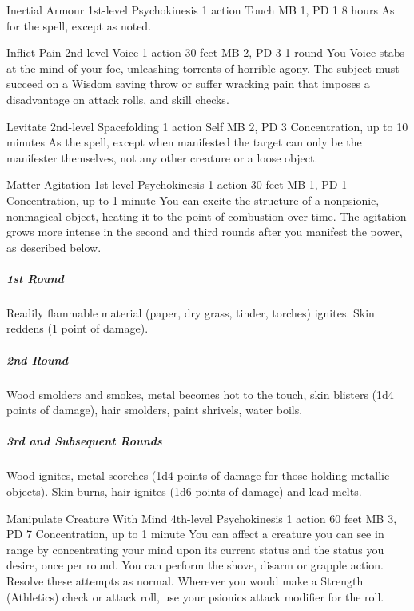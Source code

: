 \DndPowerHeader%
  {Inertial Armour}
  {1st-level Psychokinesis}
  {1 action}
  {Touch}
  {MB 1, PD 1}
  {8 hours}
As for the  spell, except as noted.

\DndPowerHeader%
  {Inflict Pain}
  {2nd-level Voice}
  {1 action}
  {30 feet}
  {MB 2, PD 3}
  {1 round}
  You Voice stabs at the mind of your foe,
  unleashing torrents of horrible agony.
  The subject must succeed on a Wisdom saving throw or
  suffer wracking pain that imposes a disadvantage on attack rolls,
  and skill checks.

\DndPowerHeader%
  {Levitate}
  {2nd-level Spacefolding}
  {1 action}
  {Self}
  {MB 2, PD 3}
  {Concentration, up to 10 minutes}
As the  spell,
except when manifested the target can only be the manifester themselves,
not any other creature or a loose object.

\DndPowerHeader%
  {Matter Agitation}
  {1st-level Psychokinesis}
  {1 action}
  {30 feet}
  {MB 1, PD 1}
  {Concentration, up to 1 minute}
  You can excite the structure of a nonpsionic,
  nonmagical object,
  heating it to the point of combustion over time.
  The agitation grows more intense in the second and third rounds
  after you manifest the power, as described below.

  \subparagraph{1st Round}
    Readily flammable material
    (paper, dry grass, tinder, torches) ignites.
    Skin reddens (1 point of damage).
  \subparagraph{2nd Round}
    Wood smolders and smokes,
    metal becomes hot to the touch,
    skin blisters (1d4 points of damage),
    hair smolders, paint shrivels, water boils.
  \subparagraph{3rd and Subsequent Rounds}
    Wood ignites, metal scorches
    (1d4 points of damage for those holding metallic objects).
    Skin burns, hair ignites (1d6 points of damage) and lead melts.

\DndPowerHeader%
  {Manipulate Creature With Mind}
  {4th-level Psychokinesis}
  {1 action}
  {60 feet}
  {MB 3, PD 7}
  {Concentration, up to 1 minute}
You can affect a creature you can see in range by
concentrating your mind upon its current status
and the status you desire, once per round.
You can perform the shove, disarm or grapple action.
Resolve these attempts as normal.
Wherever you would make a Strength (Athletics) check or attack roll,
use your psionics attack modifier for the roll.
  
